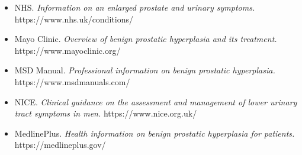 \begin{itemize}
    \item NHS. \textit{Information on an enlarged prostate and urinary symptoms.} https://www.nhs.uk/conditions/
    \item Mayo Clinic. \textit{Overview of benign prostatic hyperplasia and its treatment.} https://www.mayoclinic.org/
    \item MSD Manual. \textit{Professional information on benign prostatic hyperplasia.} https://www.msdmanuals.com/
    \item NICE. \textit{Clinical guidance on the assessment and management of lower urinary tract symptoms in men.} https://www.nice.org.uk/
    \item MedlinePlus. \textit{Health information on benign prostatic hyperplasia for patients.} https://medlineplus.gov/
\end{itemize}
